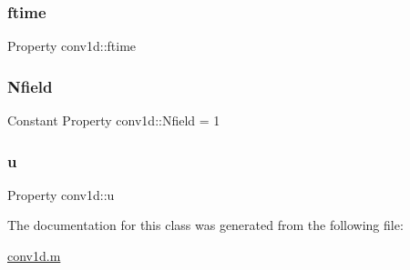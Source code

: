 \mbox{\label{classconv1d_a14e36ea9e24c4edb42b697488f646045}} 
\subsubsection{\texorpdfstring{ftime}{ftime}}
{\footnotesize\ttfamily Property conv1d\+::ftime\hspace{0.3cm}{\ttfamily [protected]}}

\mbox{\label{classconv1d_a7f1670988008db1e4e5265f067f4479b}} 
\subsubsection{\texorpdfstring{Nfield}{Nfield}}
{\footnotesize\ttfamily Constant Property conv1d\+::\+Nfield = 1}

\mbox{\label{classconv1d_ac5c4990e0891351a2831da5e8845d0d2}} 
\subsubsection{\texorpdfstring{u}{u}}
{\footnotesize\ttfamily Property conv1d\+::u\hspace{0.3cm}{\ttfamily [protected]}}



The documentation for this class was generated from the following file\+:\begin{DoxyCompactItemize}
\item 
\hyperlink{conv1d_8m}{conv1d.\+m}\end{DoxyCompactItemize}
